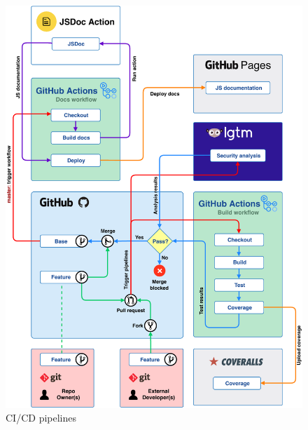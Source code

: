 \begin{figure}[hp!]
    \setlength{\abovecaptionskip}{25pt}
    \centering
    \includegraphics[page=1,scale=1]{sections/methodology/figures/pipelines.pdf}
    \caption{CI/CD pipelines}
    \label{fig:cicd-pipelines}
\end{figure}

